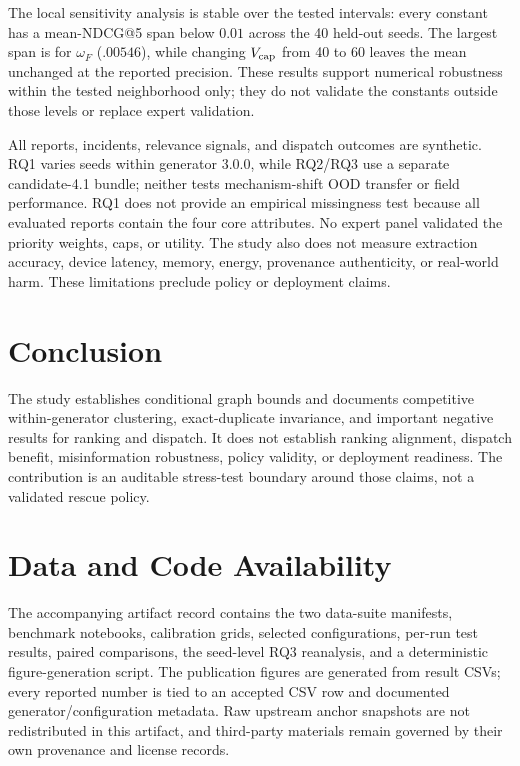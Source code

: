 \documentclass[runningheads]{llncs}
\begin{document}
The local sensitivity analysis is stable over the tested intervals: every
constant has a mean-NDCG@5 span below $0.01$ across the 40 held-out seeds. The
largest span is for $\omega_F$ ($.00546$), while changing $V_{\rm cap}$ from
40 to 60 leaves the mean unchanged at the reported precision. These results
support numerical robustness within the tested neighborhood only; they do not
validate the constants outside those levels or replace expert validation.

All reports, incidents, relevance signals, and dispatch outcomes are
synthetic. RQ1 varies seeds within generator 3.0.0, while RQ2/RQ3 use a
separate candidate-4.1 bundle; neither tests mechanism-shift OOD transfer or
field performance. RQ1 does not provide an empirical missingness test because
all evaluated reports contain the four core attributes. No expert panel
validated the priority weights, caps, or utility. The study also does not
measure extraction accuracy, device latency, memory, energy, provenance
authenticity, or real-world harm. These limitations preclude policy or
deployment claims.

\section{Conclusion}

The study establishes conditional graph bounds and documents competitive
within-generator clustering, exact-duplicate invariance, and important
negative results for ranking and dispatch. It does not establish ranking
alignment, dispatch benefit, misinformation robustness, policy validity, or
deployment readiness. The contribution is an auditable stress-test boundary
around those claims, not a validated rescue policy.

\section*{Data and Code Availability}

The accompanying artifact record contains the two data-suite manifests,
benchmark notebooks, calibration grids, selected configurations, per-run test
results, paired comparisons, the seed-level RQ3 reanalysis, and a deterministic
figure-generation script. The publication figures are generated from result
CSVs; every reported number is tied to an accepted CSV row and documented
generator/configuration metadata. Raw upstream anchor snapshots are not
redistributed in this artifact, and third-party materials remain governed by
their own provenance and license records.
\end{document}
